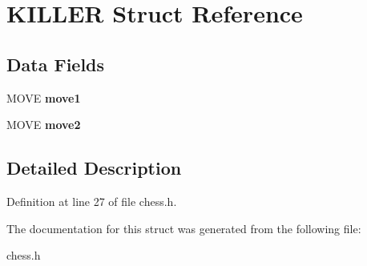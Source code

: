 \hypertarget{struct_k_i_l_l_e_r}{\section{K\-I\-L\-L\-E\-R Struct Reference}
\label{struct_k_i_l_l_e_r}
}
\subsection*{Data Fields}
\begin{DoxyCompactItemize}
\item 
\hypertarget{struct_k_i_l_l_e_r_a5049bebbf8d114cfe3c6c71608040cf1}{M\-O\-V\-E {\bfseries move1}}\label{struct_k_i_l_l_e_r_a5049bebbf8d114cfe3c6c71608040cf1}

\item 
\hypertarget{struct_k_i_l_l_e_r_af1a0db7a1931dceefb2ad8f78dd0a69a}{M\-O\-V\-E {\bfseries move2}}\label{struct_k_i_l_l_e_r_af1a0db7a1931dceefb2ad8f78dd0a69a}

\end{DoxyCompactItemize}


\subsection{Detailed Description}


Definition at line 27 of file chess.\-h.



The documentation for this struct was generated from the following file\-:\begin{DoxyCompactItemize}
\item 
chess.\-h\end{DoxyCompactItemize}
